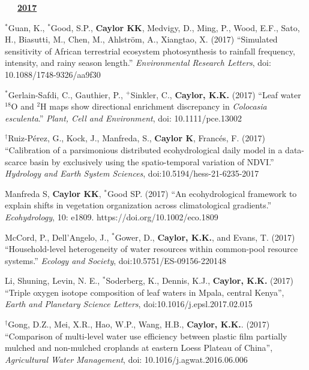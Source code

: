 \documentclass[10pt]{report}
\begin{document}
\begin{etaremune}
\mbox{\ \ \ \underline{\textbf{2017}}}

\item  $^{*}$Guan, K.,  $^{*}$Good, S.P.,  \textbf{Caylor KK}, Medvigy, D., Ming, P., Wood, E.F., Sato, H., Biasutti, M., Chen, M., Ahlstr{\"o}m, A., Xiangtao, X. (2017) ``Simulated sensitivity of African terrestrial ecosystem photosynthesis to rainfall frequency, intensity, and rainy season length.'' {\em Environmental Research Letters}, doi: 10.1088/1748-9326/aa9f30

\item $^{*}$Gerlain-Safdi, C., Gauthier, P.,  $^{+}$Sinkler, C.,  \textbf{Caylor, K.K.} (2017) ``Leaf water $^{18}$O and $^{2}$H maps show directional enrichment discrepancy in {\em Colocasia esculenta}.'' {\em Plant, Cell and Environment}, doi: 10.1111/pce.13002

\item $^{\dagger}$Ruiz-P\'erez, G., Kock, J., Manfreda, S., \textbf{Caylor K}, Franc\'es, F. (2017) ``Calibration of a parsimonious distributed ecohydrological daily model in a data-scarce basin by exclusively using the spatio-temporal variation of NDVI.'' {\em Hydrology and Earth System Sciences}, doi:10.5194/hess-21-6235-2017 

\item Manfreda S, \textbf{Caylor KK},  $^{*}$Good SP.  (2017) ``An ecohydrological framework to explain shifts in vegetation organization across climatological gradients.'' {\em Ecohydrology}, 10: e1809. https://doi.org/10.1002/eco.1809

\item McCord, P., Dell'Angelo, J., $^{*}$Gower, D.,  \textbf{Caylor, K.K.}, and Evans, T. (2017) ``Household-level heterogeneity of water resources within common-pool resource systems.'' {\em Ecology and Society}, doi:10.5751/ES-09156-220148

\item Li, Shuning, Levin, N. E.,  $^{*}$Soderberg, K., Dennis, K.J., \textbf{Caylor, K.K.} (2017) ``Triple oxygen isotope composition of leaf waters in Mpala, central Kenya'', {\em Earth and Planetary Science Letters}, doi:10.1016/j.epsl.2017.02.015

\item $^{\dagger}$Gong, D.Z., Mei, X.R., Hao, W.P., Wang, H.B., \textbf{Caylor, K.K.}. (2017) ``Comparison of multi-level water use efficiency between plastic film partially mulched and non-mulched croplands at eastern Loess Plateau of China'', {\em Agricultural Water Management}, doi: 10.1016/j.agwat.2016.06.006


\end{etaremune}
\end{document}
